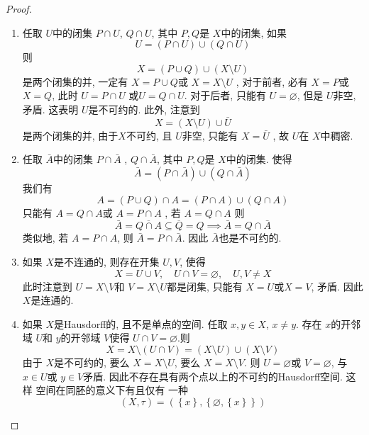 \documentclass[../main.tex]{subfiles}
\begin{document}
\begin{proof}
    \begin{enumerate}
        \item 任取 \(  U  \)中的闭集 \(  P\cap U  \), \(  Q\cap U  \), 其中 \(  P,Q  \)是 \(  X  \)中的闭集, 如果 \[
        U= \left( P\cap U \right)\cup \left( Q\cap U \right)  
        \]则 \[
        X= \left( P\cup Q \right)\cup \left( X\setminus U   \right) 
        \]     是两个闭集的并, 一定有 \(  X= P\cup Q  \)或 \(  X= X\setminus U   \)  , 对于前者, 必有 \(  X= P  \)或 \(  X= Q  \), 此时 \(  U= P\cap U  \) 或\(  U= Q\cap U  \). 对于后者, 只能有 \(  U= \varnothing \), 但是 \(  U  \)非空, 矛盾. 这表明    \(  U  \)是不可约的. 此外, 注意到 \[
        X= \left( X\setminus U \right)\cup \bar{U} 
        \]   是两个闭集的并, 由于\(  X  \)不可约, 且  \(  U  \)非空, 只能有 \(  X= \bar{U}  \) , 故 \(  U  \)在 \(  X  \)中稠密.   
        \item 任取 \(  \bar{A}  \)中的闭集 \(  P\cap \bar{A}  \)  , \(  Q\cap \bar{A}  \), 其中 \(  P,Q  \)是 \(  X  \)中的闭集. 使得 \[
        \bar{A}= \left( P\cap \bar{A} \right)\cup \left( Q\cap \bar{A} \right)  
        \]我们有 \[
        A=  \left( P\cup Q \right)\cap A= \left( P\cap A \right)\cup \left( Q\cap A \right)  
        \]只能有 \(  A= Q\cap A  \)或 \(  A= P\cap A  \)  , 若 \(    A= Q\cap A\) 则 \[
        \bar{A}= \overline{Q\cap A}\subseteq  \overline{Q}= Q\implies  \bar{A}=  Q\cap \bar{A}
        \]   类似地, 若 \(  A= P\cap A  \), 则 \(  \bar{A}=  P\cap \bar{A}  \). 因此 \(  \bar{A}  \)也是不可约的.
        \item 如果 \(  X  \)是不连通的, 则存在开集 \(  U,V  \), 使得 \[
        X= U\cup V,\quad U\cap V= \varnothing,\quad U,V\neq X
        \]  此时注意到 \(  U= X\setminus V  \)和 \(  V= X\setminus U  \)都是闭集, 只能有 \(  X= U  \)或\(  X= V  \), 矛盾.  因此 \(  X  \)是连通的.     
        \item 如果 \(  X  \)是Hausdorff的, 且不是单点的空间. 任取 \(  x,y \in X  \), \(  x \neq y  \). 存在 \(  x  \)的开邻域 \(  U  \)和 \(  y  \)的开邻域 \(  V  \)使得 \(  U\cap V= \varnothing  \).则 \[
        X=X\setminus \left( U\cap V \right)=   \left( X\setminus U \right)\cup \left( X\setminus V \right)  
        \]  由于 \(  X  \)是不可约的, 要么 \(  X= X\setminus U  \), 要么 \(  X= X\setminus V  \). 则 \(  U= \varnothing  \)或 \(  V= \varnothing  \), 与 \(  x \in U  \)或 \(  y \in V  \)矛盾. 因此不存在具有两个点以上的不可约的Hausdorff空间.   这样  空间在同胚的意义下有且仅有 一种\[
     \left( X,\tau  \right)= \left( \left\{ x \right\}, \left\{ \varnothing, \left\{ x \right\} \right\} \right)  
\]
\end{enumerate}
\end{proof}
\end{document}
